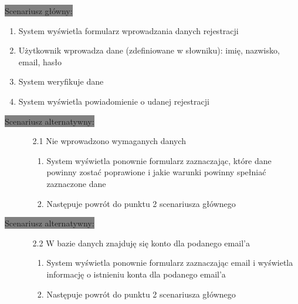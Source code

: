 \documentclass[12pt]{report}
\begin{document}
	\colorbox{grey}{Scenariusz główny:}
		\begin{enumerate}
			\item System wyświetla formularz wprowadzania danych rejestracji
			\item Użytkownik wprowadza dane (zdefiniowane w słowniku): imię, nazwisko, email, hasło
			\item System weryfikuje dane
			\item System wyświetla powiadomienie o udanej rejestracji
		\end{enumerate}
	
	\colorbox{grey}{Scenariusz alternatywny:}
		\begin{enumerate}\addtocounter{enumi}{2}
			\item[]
			\begin{enumerate}
				\item[2.1] Nie wprowadzono wymaganych danych
				\begin{enumerate}
					\item System wyświetla ponownie formularz zaznaczając, które dane powinny zostać poprawione i jakie warunki powinny spełniać zaznaczone dane
					\item Następuje powrót do punktu 2 scenariusza głównego
				\end{enumerate}
			\end{enumerate}
		\end{enumerate}

	\colorbox{grey}{Scenariusz alternatywny:}
	\begin{enumerate}\addtocounter{enumi}{2}
		\item[]
		\begin{enumerate}
			\item[2.2] W bazie danych znajduję się konto dla podanego email’a
			\begin{enumerate}
				\item System wyświetla ponownie formularz zaznaczając email i wyświetla informację o istnieniu konta dla podanego email’a
				\item Następuje powrót do punktu 2 scenariusza głównego
			\end{enumerate}
		\end{enumerate}
	\end{enumerate}
\end{document}

